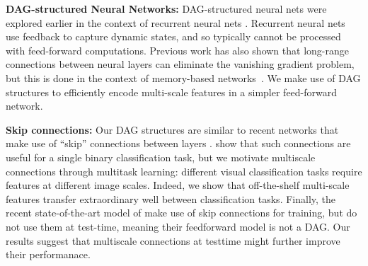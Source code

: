 \documentclass[10pt,twocolumn,letterpaper]{article}
\begin{document}

{\bf DAG-structured Neural Networks:} DAG-structured neural nets were explored earlier in the context of recurrent neural nets \cite{baldi2003principled,graves2009offline}. Recurrent neural nets use feedback to capture dynamic states, and so typically cannot be processed with feed-forward computations. Previous work has also shown that long-range connections between neural layers can eliminate the vanishing gradient problem, but this is done in the context of memory-based networks~\cite{hochreiter1997long}. We make use of DAG structures to efficiently encode multi-scale features in a simpler feed-forward network. 

{\bf Skip connections:} Our DAG structures are similar to recent networks that make use of ``skip'' connections between layers \cite{raiko-aistats-12,szegedy2014going,sermanet2013pedestrian}. \cite{raiko-aistats-12} show that such connections are useful for a single binary classification task, but we motivate multiscale connections through multitask learning: different visual classification tasks require features at different image scales. Indeed, we show that off-the-shelf multi-scale features transfer extraordinary well between classification tasks. Finally, the recent state-of-the-art model of \cite{szegedy2014going} make use of skip connections for training, but do not use them at test-time, meaning their feedforward model is not a DAG. Our results suggest that multiscale connections at testtime might further improve their performanace.
\end{document}
